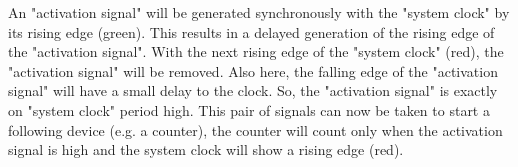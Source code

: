 An "activation signal" will be generated synchronously with the "system clock" by its rising edge (green). This results in a delayed generation of the rising edge of the "activation signal". With the next rising edge of the "system clock" (red), the "activation signal" will be removed. Also here, the falling edge of the "activation signal" will have a small delay to the clock. So, the "activation signal" is exactly on "system clock" period high. This pair of signals can now be taken to start a following device (e.g. a counter), the counter will count only when the activation signal is high and the system clock will show a rising edge (red).